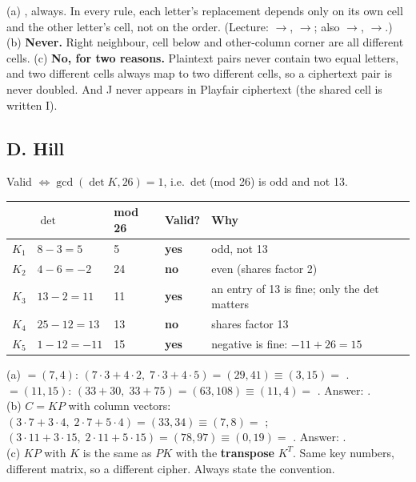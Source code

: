 \ans (a) \textbf{}, always. In every rule, each letter's replacement depends only on its own cell and the other letter's cell, not on the order. (Lecture: $\to$, $\to$; also $\to$, $\to$.)
(b) \textbf{Never.} Right neighbour, cell below and other-column corner are all different cells.
(c) \textbf{No, for two reasons.} Plaintext pairs never contain two equal letters, and two different cells always map to two different cells, so a ciphertext pair is never doubled. And J never appears in Playfair ciphertext (the shared cell is written I).

\subsection*{D. Hill}

\ans Valid $\iff \gcd(\det K, 26) = 1$, i.e.\ det (mod 26) is odd and not 13.
\begin{center}\small
\begin{tabular}{@{}lllll@{}}
\toprule
& $\det$ & mod 26 & Valid? & Why\\
\midrule
$K_1$ & $8-3=5$ & 5 & \textbf{yes} & odd, not 13\\
$K_2$ & $4-6=-2$ & 24 & \textbf{no} & even (shares factor 2)\\
$K_3$ & $13-2=11$ & 11 & \textbf{yes} & an entry of 13 is fine; only the det matters\\
$K_4$ & $25-12=13$ & 13 & \textbf{no} & shares factor 13\\
$K_5$ & $1-12=-11$ & 15 & \textbf{yes} & negative is fine: $-11+26=15$\\
\bottomrule
\end{tabular}
\end{center}

\ans (a)  $=(7,4)$: $(7\cdot3+4\cdot2,\;7\cdot3+4\cdot5) = (29, 41) \equiv (3, 15) = $ .
 $=(11,15)$: $(33+30,\;33+75) = (63, 108) \equiv (11, 4) = $ . Answer: \textbf{}.\\
(b) $C = KP$ with column vectors: $(3\cdot7+3\cdot4,\;2\cdot7+5\cdot4) = (33,34) \equiv (7,8) = $ ; $(3\cdot11+3\cdot15,\;2\cdot11+5\cdot15) = (78, 97) \equiv (0,19) = $ . Answer: \textbf{}.\\
(c) $KP$ with $K$ is the same as $PK$ with the \textbf{transpose} $K^T$. Same key numbers, different matrix, so a different cipher. Always state the convention.

